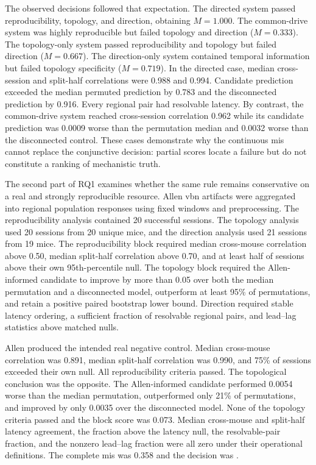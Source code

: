 \documentclass[a4paper,fleqn]{cas-sc}
\begin{document}
The observed decisions followed that expectation. The directed system passed
reproducibility, topology, and direction, obtaining $M=1.000$. The common-drive
system was highly reproducible but failed topology and direction
($M=0.333$). The topology-only system passed reproducibility and topology but
failed direction ($M=0.667$). The direction-only system contained temporal
information but failed topology specificity ($M=0.719$). In the directed case,
median cross-session and split-half correlations were 0.988 and 0.994. Candidate
prediction exceeded the median permuted prediction by 0.783 and the
disconnected prediction by 0.916. Every regional pair had resolvable
latency. By contrast, the common-drive system reached cross-session correlation
0.962 while its candidate prediction was 0.0009 worse than the permutation
median and 0.0032 worse than the disconnected control. These cases demonstrate
why the continuous \acs{mis} cannot replace the conjunctive decision: partial scores
locate a failure but do not constitute a ranking of mechanistic truth.

The second part of RQ1 examines whether the same rule remains conservative on a
real and strongly reproducible resource. Allen \ac{vbn}
artifacts were aggregated into regional population responses using fixed
windows and preprocessing. The reproducibility analysis contained 20 successful
sessions. The topology analysis used 20 sessions from 20 unique mice, and the
direction analysis used 21 sessions from 19 mice. The reproducibility block
required median cross-mouse correlation above 0.50, median split-half
correlation above 0.70, and at least half of sessions above their own
95th-percentile null. The topology block required the Allen-informed candidate
to improve by more than 0.05 over both the median permutation and a disconnected
model, outperform at least 95\% of permutations, and retain a positive paired
bootstrap lower bound. Direction required stable latency ordering, a sufficient
fraction of resolvable regional pairs, and lead--lag statistics above matched
nulls.

Allen produced the intended real negative control. Median cross-mouse
correlation was 0.891, median split-half correlation was 0.990, and 75\% of
sessions exceeded their own null. All reproducibility criteria passed. The
topological conclusion was the opposite. The Allen-informed candidate performed
0.0054 worse than the median permutation, outperformed only 21\% of
permutations, and improved by only 0.0035 over the disconnected model. None of
the topology criteria passed and the block score was 0.073. Median cross-mouse
and split-half latency agreement, the fraction above the latency null, the
resolvable-pair fraction, and the nonzero lead--lag fraction were all zero under
their operational definitions. The complete \acs{mis} was 0.358 and the decision was
.
\end{document}

